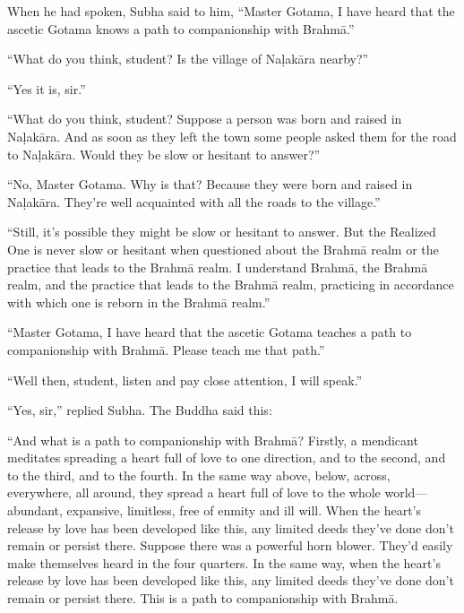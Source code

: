 \documentclass[12pt,openany]{book}%
\begin{document}
When he had spoken, Subha said to him, “Master Gotama, I have heard that the ascetic Gotama knows a path to companionship with \textsanskrit{Brahmā}.” 

“What do you think, student? Is the village of \textsanskrit{Naḷakāra} nearby?” 

“Yes it is, sir.” 

“What do you think, student? Suppose a person was born and raised in \textsanskrit{Naḷakāra}. And as soon as they left the town some people asked them for the road to \textsanskrit{Naḷakāra}. Would they be slow or hesitant to answer?” 

“No, Master Gotama. Why is that? Because they were born and raised in \textsanskrit{Naḷakāra}. They’re well acquainted with all the roads to the village.” 

“Still, it’s possible they might be slow or hesitant to answer. But the Realized One is never slow or hesitant when questioned about the \textsanskrit{Brahmā} realm or the practice that leads to the \textsanskrit{Brahmā} realm. I understand \textsanskrit{Brahmā}, the \textsanskrit{Brahmā} realm, and the practice that leads to the \textsanskrit{Brahmā} realm, practicing in accordance with which one is reborn in the \textsanskrit{Brahmā} realm.” 

“Master Gotama, I have heard that the ascetic Gotama teaches a path to companionship with \textsanskrit{Brahmā}. Please teach me that path.” 

“Well then, student, listen and pay close attention, I will speak.” 

“Yes, sir,” replied Subha. The Buddha said this: 

“And what is a path to companionship with \textsanskrit{Brahmā}? Firstly, a mendicant meditates spreading a heart full of love to one direction, and to the second, and to the third, and to the fourth. In the same way above, below, across, everywhere, all around, they spread a heart full of love to the whole world—abundant, expansive, limitless, free of enmity and ill will. When the heart’s release by love has been developed like this, any limited deeds they’ve done don’t remain or persist there. Suppose there was a powerful horn blower. They’d easily make themselves heard in the four quarters. In the same way, when the heart’s release by love has been developed like this, any limited deeds they’ve done don’t remain or persist there. This is a path to companionship with \textsanskrit{Brahmā}. 
\end{document}

